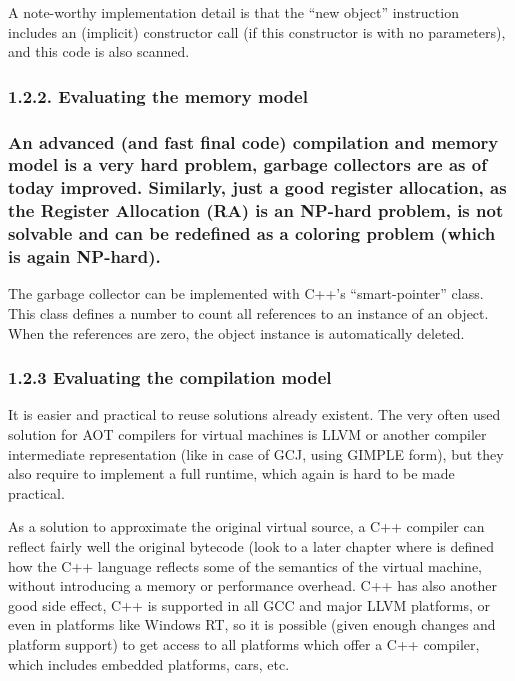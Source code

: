 \documentclass[letterpaper]{article}
\begin{document}
A note-worthy implementation detail is that the ``new object'' instruction includes an (implicit) constructor call (if
this constructor is with no parameters), and this code is also scanned.


\bigskip

\subsubsection[1.2.2. Evaluating the memory model ]{1.2.2. Evaluating the memory model }
\subsubsection[An advanced (and fast final code) compilation and memory model is a very hard problem, garbage collectors
are as of today improved. Similarly, just a good register allocation, as the Register Allocation (RA) is an NP{}-hard
problem, is not solvable and can be redefined as a coloring problem (which is again NP{}-hard). ]{An advanced (and fast
final code) compilation and memory model is a very hard problem, garbage collectors are as of today improved.
Similarly, just a good register allocation, as the Register Allocation (RA) is an NP-hard problem, is not solvable and
can be redefined as a coloring problem (which is again NP-hard). }
The garbage collector can be implemented with C++'s ``smart-pointer'' class. This class defines a number to count all
references to an instance of an object. When the references are zero, the object instance is automatically deleted.

\subsubsection{}
\subsubsection[1.2.3 Evaluating the compilation model]{1.2.3 Evaluating the compilation model}
It is easier and practical to reuse solutions already existent. The very often used solution for AOT compilers for
virtual machines is LLVM or another compiler intermediate representation (like in case of GCJ, using GIMPLE form), but
they also require to implement a full runtime, which again is hard to be made practical.

As a solution to approximate the original virtual source, a C++ compiler can reflect fairly well the original bytecode
(look to a later chapter where is defined how the C++ language reflects some of the semantics of the virtual machine,
without introducing a memory or performance overhead. C++ has also another good side effect, C++ is supported in all
GCC and major LLVM platforms, or even in platforms like Windows RT, so it is possible (given enough changes and
platform support) to get access to all platforms which offer a C++ compiler, which includes embedded platforms, cars,
etc.
\end{document}
